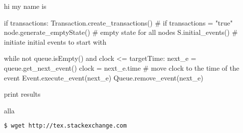 hi my name is 
    \begin{python}
        if transactions: Transaction.create_transactions() # if transactions = "true"
        node.generate_emptyState() # empty state for all nodes
        S.initial_events() # initiate initial events to start with
        
        while not queue.isEmpty() and clock <= targetTime:
              next_e = queue.get_next_event()
              clock = next_e.time # move clock to the time of the event
              Event.execute_event(next_e)
              Queue.remove_event(next_e)
        
        print results
        \end{python}
    alla


    \begin{lstlisting}[language=bash]
        $ wget http://tex.stackexchange.com
      \end{lstlisting}
